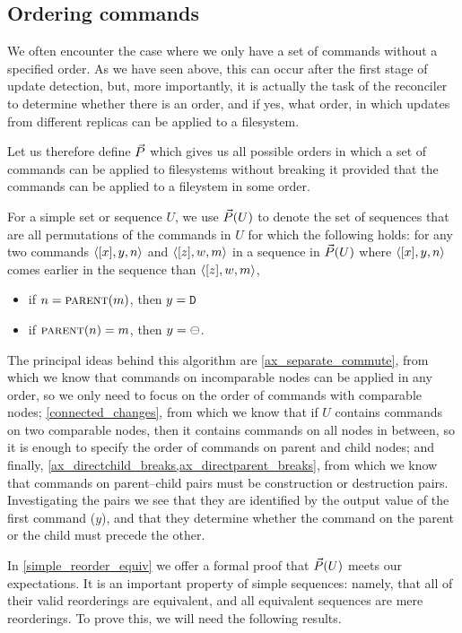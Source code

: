 
\subsection{Ordering commands}\label{ordering}

We often encounter the case where we only have a set of commands without a specified order.
As we have seen above, this can occur after the first stage of update detection,
but, more importantly,
it is actually the task of the reconciler to determine whether there is an order,
and if yes, what order,
in which updates from different replicas can be applied to a filesystem.

Let us therefore define $\ordersetsign$ which gives us all
possible orders in which a set of commands can be applied
to filesystems without breaking it
provided that the commands can be applied to a fileystem in some order.

\begin{mydef}[$\ordersetsign$]\label{def_orderset}
For a simple set or sequence $U$,
we use $\vec{P}({U})$ to denote the set of sequences
that are all permutations of the commands in $U$
for which the following holds:
for any two commands $\langle{[x],y,n}\rangle$ and $\langle{[z],w,m}\rangle$ in a sequence in $\vec{P}({U})$
where $\langle{[x],y,n}\rangle$ comes earlier in the sequence than $\langle{[z],w,m}\rangle$,
\begin{itemize}
\item if $n=\text{\normalfont\scshape{parent}}(m)$, then $y=\mathtt{D}$
\item if $\text{\normalfont\scshape{parent}}(n)=m$, then $y=\ominus$.
\end{itemize}
\end{mydef}

The principal ideas behind this algorithm are 
\cref{ax_separate_commute}, from which we know that commands on incomparable
nodes can be applied in any order, so we only need to focus on the order of commands
with comparable nodes;
\cref{connected_changes}, from which we know that if $U$ contains commands on two comparable
nodes, then it contains commands on all nodes in between, so it is enough to specify
the order of commands on parent and child nodes;
and finally, \cref{ax_directchild_breaks,ax_directparent_breaks}, from which we know
that commands on parent--child pairs must be construction or destruction pairs.
Investigating the pairs we see that they are identified by the output value of the first command ($y$),
and that they determine whether the command on the parent or the child must precede the other.

In \cref{simple_reorder_equiv} we offer a formal proof that $\vec{P}({U})$ meets our expectations.
It is an important property of simple sequences: namely, that
all of their valid reorderings are equivalent,
and all equivalent sequences are mere reorderings.
To prove this, we will need the following results.

